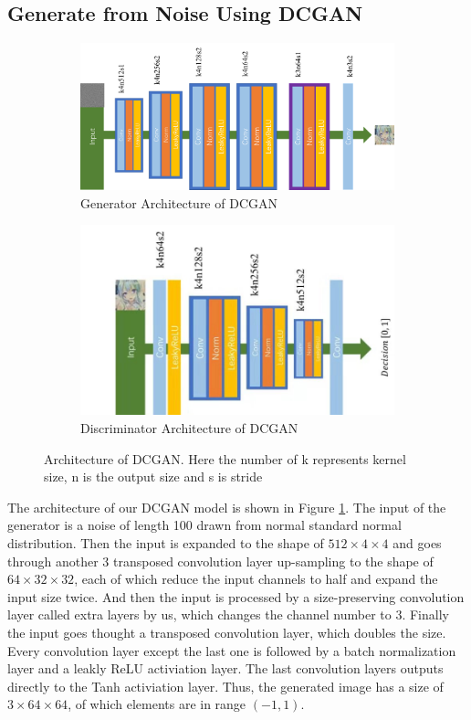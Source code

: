 \documentclass[10pt,twocolumn,letterpaper]{article}
\begin{document}
\subsection{Generate from Noise Using DCGAN}

\begin{figure}[t]
   \centering
   \begin{subfigure}{\linewidth}
      \centering
      \includegraphics[width=.7\linewidth]{dcgan-g}
      \caption{Generator Architecture of DCGAN}
   \end{subfigure}
   \begin{subfigure}{\linewidth}
      \centering
      \includegraphics[width=.7\linewidth]{dcgan-d}
      \caption{Discriminator Architecture of DCGAN}
   \end{subfigure}
   \caption{Architecture of DCGAN. Here the number of k represents kernel size,
   n is the output size and s is stride}
   \label{fig:dcgan-arch}
\end{figure}

The architecture of our DCGAN model is shown in Figure \ref{fig:dcgan-arch}. The
input of the generator is a noise of length 100 drawn from normal standard
normal distribution. Then the input is expanded to the shape of
$512\times 4\times 4$ and goes through another 3 transposed convolution layer
up-sampling to the shape of $64\times 32\times 32$, each of which reduce the
input channels to half and expand the input size twice. And then the input is
processed by a size-preserving convolution layer called extra layers by us,
which changes the channel number to 3. Finally the input goes thought a
transposed convolution layer, which doubles the size. Every convolution layer
except the last one is followed by a batch normalization layer and a leakly ReLU
activiation layer. The last convolution layers outputs directly to the Tanh
activiation layer. Thus, the generated image has a size of
$3\times 64\times 64$, of which elements are in range $(-1, 1)$.
\end{document}
